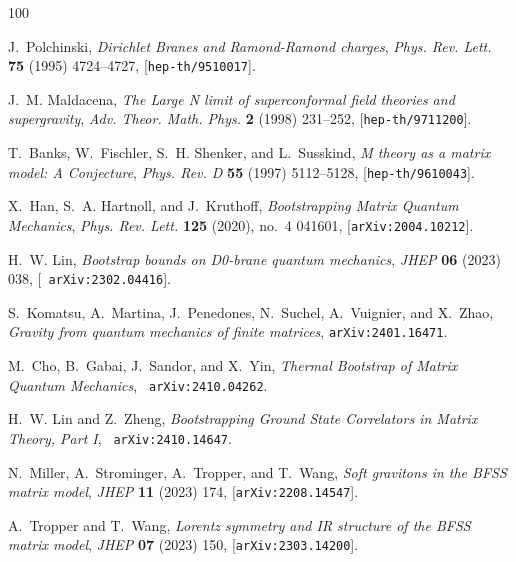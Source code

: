 \documentclass[11pt]{article}
\begin{document}
\providecommand{\href}[2]{#2}\begingroup\raggedright\begin{thebibliography}{100}

J.~Polchinski, {\it {Dirichlet Branes and Ramond-Ramond charges}},  {\em Phys.
  Rev. Lett.} {\bf 75} (1995) 4724--4727,
  [\href{http://arxiv.org/abs/hep-th/9510017}{{\tt hep-th/9510017}}].

J.~M. Maldacena, {\it {The Large N limit of superconformal field theories and
  supergravity}},  {\em Adv. Theor. Math. Phys.} {\bf 2} (1998) 231--252,
  [\href{http://arxiv.org/abs/hep-th/9711200}{{\tt hep-th/9711200}}].

T.~Banks, W.~Fischler, S.~H. Shenker, and L.~Susskind, {\it {M theory as a
  matrix model: A Conjecture}},  {\em Phys. Rev. D} {\bf 55} (1997) 5112--5128,
  [\href{http://arxiv.org/abs/hep-th/9610043}{{\tt hep-th/9610043}}].

X.~Han, S.~A. Hartnoll, and J.~Kruthoff, {\it {Bootstrapping Matrix Quantum
  Mechanics}},  {\em Phys. Rev. Lett.} {\bf 125} (2020), no.~4 041601,
  [\href{http://arxiv.org/abs/2004.10212}{{\tt arXiv:2004.10212}}].

H.~W. Lin, {\it {Bootstrap bounds on D0-brane quantum mechanics}},  {\em JHEP}
  {\bf 06} (2023) 038, [\href{http://arxiv.org/abs/2302.04416}{{\tt
  arXiv:2302.04416}}].

S.~Komatsu, A.~Martina, J.~Penedones, N.~Suchel, A.~Vuignier, and X.~Zhao, {\it
  {Gravity from quantum mechanics of finite matrices}},
  \href{http://arxiv.org/abs/2401.16471}{{\tt arXiv:2401.16471}}.

M.~Cho, B.~Gabai, J.~Sandor, and X.~Yin, {\it {Thermal Bootstrap of Matrix
  Quantum Mechanics}},  \href{http://arxiv.org/abs/2410.04262}{{\tt
  arXiv:2410.04262}}.

H.~W. Lin and Z.~Zheng, {\it {Bootstrapping Ground State Correlators in Matrix
  Theory, Part I}},  \href{http://arxiv.org/abs/2410.14647}{{\tt
  arXiv:2410.14647}}.

N.~Miller, A.~Strominger, A.~Tropper, and T.~Wang, {\it {Soft gravitons in the
  BFSS matrix model}},  {\em JHEP} {\bf 11} (2023) 174,
  [\href{http://arxiv.org/abs/2208.14547}{{\tt arXiv:2208.14547}}].

A.~Tropper and T.~Wang, {\it {Lorentz symmetry and IR structure of the BFSS
  matrix model}},  {\em JHEP} {\bf 07} (2023) 150,
  [\href{http://arxiv.org/abs/2303.14200}{{\tt arXiv:2303.14200}}].


\end{thebibliography}
\end{document}
